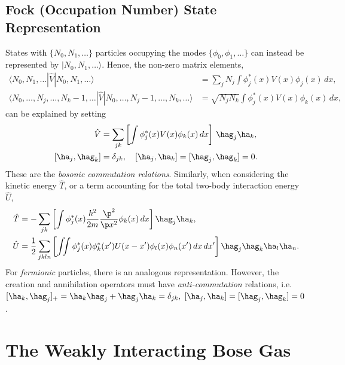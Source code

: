 \documentclass[a4paper, 11pt, normalem]{report}
\begin{document}
\section{Fock (Occupation Number) State Representation}
States with $\{N_0,N_1,\dots\}$ particles occupying the modes $\{\phi_0,\phi_1,\dots\}$ can instead be represented by $|N_0,N_1,\dots\rangle$.
Hence, the non-zero matrix elements,
\begin{align}
    \langle N_0,N_1,\dots|\hat{V}|N_0,N_1,\dots\rangle &= \sum_j N_j \int \phi_j^*(x)V(x)\phi_j(x)\,dx, \\
    \langle N_0,\dots,N_j,\dots,N_k-1,\dots|\hat{V}|N_0,\dots,N_j-1,\dots,N_k,\dots\rangle &= \sqrt{N_jN_k}\int \phi_j^*(x)V(x)\phi_k(x)\,dx,
\end{align}
can be explained by setting
\begin{align}
    \hat{V} &= \sum_{jk}\left[\int \phi_j^*(x)V(x)\phi_k(x)\,dx\right]\,\hag_j\ha_k, \\
    [\ha_j,\hag_k] &= \delta_{jk},\quad [\ha_j,\ha_k] = [\hag_j,\hag_k] = 0.
\end{align}
These are the \emph{bosonic commutation relations}.
Similarly, when considering the kinetic energy $\hat{T}$, or a term accounting for the total two-body interaction energy $\hat{U}$,
\begin{align}
    \hat{T} &= -\sum_{jk}\left[\int \phi_j^*(x)\frac{\hbar^2}{2m}\frac{\p^2}{\p x^2}\phi_k(x)\,dx\right]\hag_j\ha_k, \\
    \hat{U} &= \frac12\sum_{jkln}\left[\iint \phi_j^*(x)\phi_k^*(x')U(x-x')\phi_l(x)\phi_n(x')\,dx\,dx'\right]\hag_j\hag_k\ha_l\ha_n.
\end{align}
For \emph{fermionic} particles, there is an analogous representation.
However, the creation and annihilation operators must have \emph{anti-commutation} relations, i.e. $[\ha_k,\hag_j]_+ = \ha_k\hag_j+\hag_j\ha_k = \delta_{jk},\; [\ha_j,\ha_k] = [\hag_j,\hag_k] = 0$.

\chapter{The Weakly Interacting Bose Gas}
\end{document}
